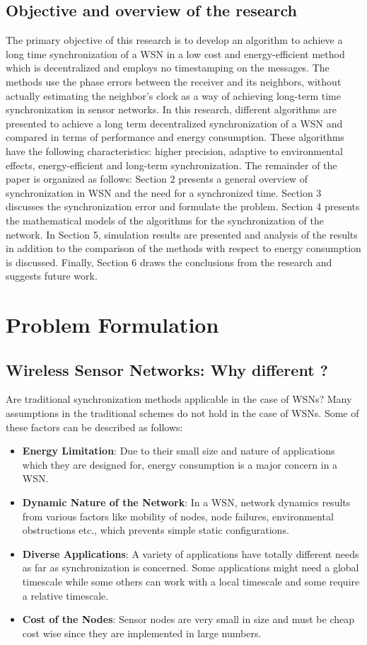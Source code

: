 \documentclass[journal]{IEEEtran}
\begin{document}
\subsection{\textbf{Objective and overview of the research}}\noindent
The primary objective of this research is to develop an algorithm to achieve a long time synchronization of a WSN in a low cost and
energy-efficient method which is decentralized and employs no timestamping on the messages. The methods use the phase errors
between the receiver and its neighbors, without actually estimating the neighbor's clock as a way of achieving long-term time synchronization in sensor networks. In this research, different algorithms are presented to achieve a long term decentralized synchronization of a WSN and compared in terms of performance and energy consumption. These algorithms have the following characteristics: higher precision, adaptive to environmental effects, energy-efficient and long-term synchronization. 
\newline The remainder of the paper is organized as follows:  Section 2 presents a general overview of synchronization in WSN and the need
for a synchronized time. Section 3 discusses the synchronization error and formulate the problem. Section 4 presents the
mathematical models of the algorithms for the synchronization of the network. In Section 5, simulation results are presented and analysis of the results in addition to the comparison of the methods with respect to energy consumption is discussed. Finally, Section 6
draws the conclusions from the research and suggests future work.
\section{\textbf{Problem Formulation}}
\subsection{\textbf{Wireless Sensor Networks: Why different ?}}
\noindent Are traditional synchronization methods applicable in the case of WSNs? Many
assumptions in the traditional schemes do not hold in the case
of WSNs. Some of these factors can be described as follows:
\begin{itemize}
\item \textbf{Energy Limitation}: Due to their small size and nature of applications which they
are designed for, energy consumption is a major concern in a WSN.
\item \textbf{Dynamic Nature of the Network}: In a WSN, network
dynamics results from various factors like mobility of nodes, node
failures, environmental obstructions etc., which prevents simple
static configurations.
\item \textbf{Diverse Applications}: A variety of applications 
have totally different needs as far as synchronization is concerned.
Some applications might need a global timescale while
some others can work with a local timescale and some require a relative timescale.
\item \textbf{Cost of the Nodes}: Sensor nodes are very small in size
and must be cheap cost wise since they are implemented in large
numbers.
\end{itemize}
\end{document}
